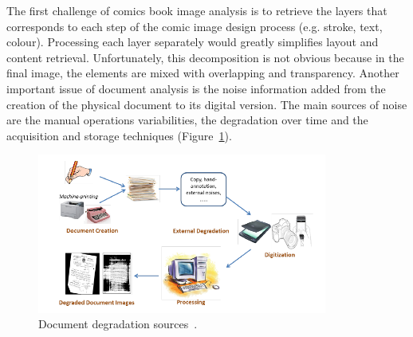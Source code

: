 The first challenge of comics book image analysis is to retrieve the layers that corresponds to each step of the comic image design process (e.g. stroke, text, colour).
Processing each layer separately would greatly simplifies layout and content retrieval.
Unfortunately, this decomposition is not obvious because in the final image, the elements are mixed with overlapping and transparency.
Another important issue of document analysis is the noise information added from the creation of the physical document to its digital version.
The main sources of noise are the manual operations variabilities, the degradation over time and the acquisition and storage techniques (Figure~\ref{fig:sota:document_degradation}).


    \begin{figure}[!ht]%
      \centering
      \includegraphics[width=0.85\textwidth]{document_degradation.png}
    \caption[Document degradation sources]{Document degradation sources~\cite{Peng2013Document}.}
    \label{fig:sota:document_degradation}
    \end{figure}





